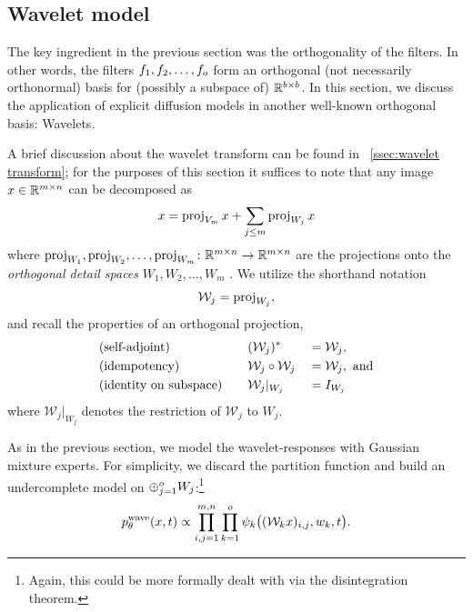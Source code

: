 \subsection{Wavelet model}%
\label{ssec:wavelet model}
The key ingredient in the previous section was the orthogonality of the filters.
In other words, the filters \( f_{\num{1}}, f_{\num{2}}, \dotsc, f_o \) form an orthogonal (not necessarily orthonormal) basis for (possibly a subspace of) \( \mathbb{R}^{b\times b} \).
In this section, we discuss the application of explicit diffusion models in another well-known orthogonal basis:
Wavelets.

A brief discussion about the wavelet transform can be found in ~\cref{ssec:wavelet transform};
for the purposes of this section it suffices to note that any image \( x \in \mathbb{R}^{m \times n} \) can be decomposed as
\begin{equation}
	x = \operatorname{proj}_{V_m} x + \sum_{j\leq m}\operatorname{proj}_{W_j} x
	\label{eq:wavelet decomposition}
\end{equation}
where \( \operatorname{proj}_{W_{\num{1}}}, \operatorname{proj}_{W_{\num{2}}},\dotsc, \operatorname{proj}_{W_m} \colon \mathbb{R}^{m \times n} \to \mathbb{R}^{m \times n} \) are the projections onto the \emph{orthogonal detail spaces} \( W_{\num{1}}, W_{\num{2}}, \dotsc, W_m \) .
We utilize the shorthand notation
\begin{equation}
	\mathcal{W}_j = \operatorname{proj}_{W_j},
\end{equation}
and recall the properties of an orthogonal projection,
\begin{alignat}{3}
	&\text{(self-adjoint)} &&(\mathcal{W}_j)^\ast &&= \mathcal{W}_j, \nonumber \\
	&\text{(idempotency)} &&\mathcal{W}_j \circ \mathcal{W}_j &&= \mathcal{W}_j,\ \text{and} \label{eq:projection}\\
	&\text{(identity on subspace)}\ \ \ &&\mathcal{W}_j|_{W_j} &&= \Identity_{W_j}\nonumber 
\end{alignat}
where \( \mathcal{W}_j|_{W_j} \) denotes the restriction of \( \mathcal{W}_j \) to \( W_j \).

As in the previous section, we model the wavelet-responses with Gaussian mixture experts.
For simplicity, we discard the partition function and build an undercomplete model on \( \oplus_{j=\num{1}}^o W_j \):\footnote{%
	Again, this could be more formally dealt with via the disintegration theorem.
}
\begin{equation}
	p^{\mathrm{wave}}_\theta(x, t) \propto \prod_{i,j=\num{1}}^{m, n} \prod_{k=\num{1}}^{o} \psi_k \bigl((\mathcal{W}_k x)_{i, j}, w_k, t\bigr).
	\label{eq:wavelet gmm}
\end{equation}

